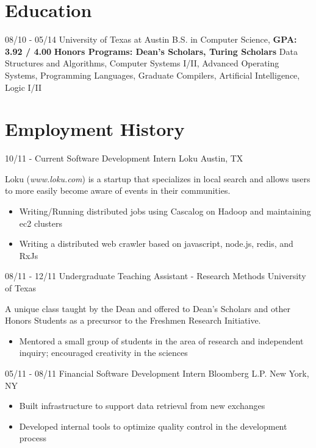 \documentclass[11pt,letter,sans]{moderncv}
\begin{document}
\maketitle

\section{Education}
\cventry
{08/10 - 05/14}
{University of Texas at Austin}
{B.S. in Computer Science, \textbf{GPA: 3.92 / 4.00}}
{}
{}
{\textbf{Honors Programs: Dean's Scholars, Turing Scholars}}
{ Data Structures and Algorithms, Computer
  Systems I/II, Advanced Operating Systems, Programming Languages, Graduate
Compilers, Artificial Intelligence, Logic I/II}


\section{Employment History}
\cventry
{10/11 - Current}
{Software Development Intern}
{Loku}
{Austin, TX}
{}
{Loku (\textit{www.loku.com}) is a startup that specializes in local search and
  allows users to more easily become aware of events in their communities.
  \begin{itemize}
    \item Writing/Running distributed jobs using Cascalog on Hadoop and
      maintaining ec2 clusters
    \item Writing a distributed web crawler based on javascript, node.js, redis, and RxJs
\end{itemize}}

\cventry
{08/11 - 12/11}
{Undergraduate Teaching Assistant - Research Methods}
{University of Texas}
{}
{}
{A unique class taught by the Dean and offered to Dean's Scholars and other
  Honors Students as a precursor to the Freshmen Research Initiative.
  \begin{itemize}
    \item Mentored a small group of students in the area of research and
      independent inquiry; encouraged creativity in the sciences
\end{itemize}}

\cventry
{05/11 - 08/11}
{Financial Software Development Intern}
{Bloomberg L.P.}
{New York, NY}
{}
{
  \begin{itemize}
    \item Built infrastructure to support data retrieval from new exchanges
    \item Developed internal tools to optimize quality control in the
      development process
\end{itemize}}
\end{document}
